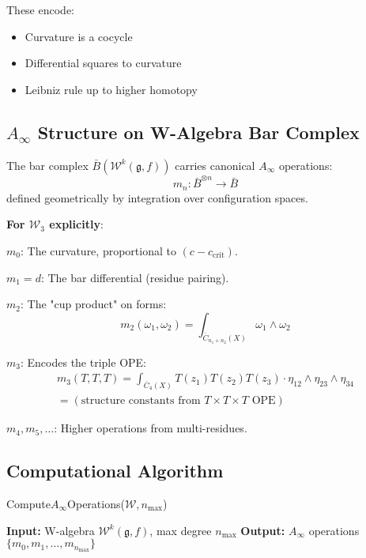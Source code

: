 \begin{principle}
\begin{remark}
These encode:
\begin{itemize}
\item Curvature is a cocycle
\item Differential squares to curvature
\item Leibniz rule up to higher homotopy
\end{itemize}
\end{remark}

\subsection{$A_\infty$ Structure on W-Algebra Bar Complex}

\begin{theorem}\label{thm:w-ainfty-ops}
The bar complex $\bar{B}(\mathcal{W}^k(\mathfrak{g},f))$ carries canonical $A_\infty$ operations:
\begin{equation}
m_n: \bar{B}^{\otimes n} \to \bar{B}
\end{equation}
defined geometrically by integration over configuration spaces.

\textbf{For $\mathcal{W}_3$ explicitly}:

$m_0$: The curvature, proportional to $(c - c_{\mathrm{crit}})$.

$m_1 = d$: The bar differential (residue pairing).

$m_2$: The "cup product" on forms:
\begin{equation}
m_2(\omega_1, \omega_2) = \int_{\overline{C}_{n_1+n_2}(X)} \omega_1 \wedge \omega_2
\end{equation}

$m_3$: Encodes the triple OPE:
\begin{multline}
m_3(T, T, T) = \int_{\overline{C}_4(X)} T(z_1) T(z_2) T(z_3) \cdot \eta_{12} \wedge \eta_{23} \wedge \eta_{34} \\
= (\text{structure constants from } T \times T \times T \text{ OPE})
\end{multline}

$m_4, m_5, \ldots$: Higher operations from multi-residues.
\end{theorem}

\subsection{Computational Algorithm}

\begin{algorithm}[H]
\caption{Compute$A_\infty$Operations($\mathcal{W}, n_{\max}$)}
\begin{algorithmic}[1]
\State \textbf{Input:} W-algebra $\mathcal{W}^k(\mathfrak{g}, f)$, max degree $n_{\max}$
\State \textbf{Output:} $A_\infty$ operations $\{m_0, m_1, \ldots, m_{n_{\max}}\}$


\end{algorithmic}
\end{algorithm}
\end{principle}
